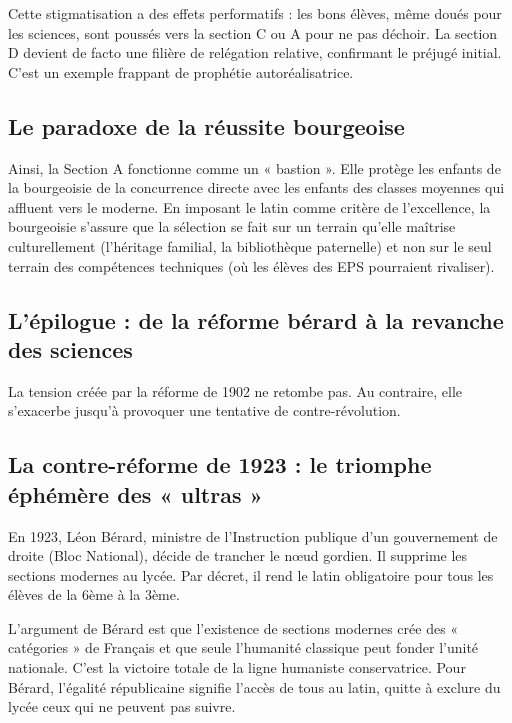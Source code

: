Cette stigmatisation a des effets performatifs : les bons élèves, même doués pour les sciences, sont
poussés vers la section C ou A pour ne pas déchoir. La section D devient de facto une filière de
relégation relative, confirmant le préjugé initial. C'est un exemple frappant de prophétie
autoréalisatrice.\cite{I-2-1-ref23}



\subsection{Le paradoxe de la réussite bourgeoise}

Ainsi, la Section A fonctionne comme un « bastion ». Elle protège les enfants de la bourgeoisie de
la concurrence directe avec les enfants des classes moyennes qui affluent vers le moderne. En
imposant le latin comme critère de l'excellence, la bourgeoisie s'assure que la sélection se fait
sur un terrain qu'elle maîtrise culturellement (l'héritage familial, la bibliothèque paternelle) et
non sur le seul terrain des compétences techniques (où les élèves des EPS pourraient rivaliser).



\subsection{L'épilogue : de la réforme bérard à la revanche des sciences}

La tension créée par la réforme de 1902 ne retombe pas. Au contraire, elle s'exacerbe jusqu'à
provoquer une tentative de contre-révolution.



\subsection{La contre-réforme de 1923 : le triomphe éphémère des « ultras »}

En 1923, Léon Bérard, ministre de l'Instruction publique d'un gouvernement de droite (Bloc
National), décide de trancher le nœud gordien. Il supprime les sections modernes au lycée. Par
décret, il rend le latin obligatoire pour tous les élèves de la 6ème à la 3ème.\cite{I-2-1-ref7}

L'argument de Bérard est que l'existence de sections modernes crée des « catégories » de Français et
que seule l'humanité classique peut fonder l'unité nationale. C'est la victoire totale de la ligne
humaniste conservatrice. Pour Bérard, l'égalité républicaine signifie l'accès de tous au latin,
quitte à exclure du lycée ceux qui ne peuvent pas suivre.\cite{I-2-1-ref24}

